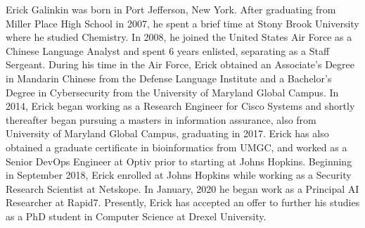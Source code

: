 \normalsize
\nonfrenchspacing
\doublespacing
\setlength{\parindent}{15pt} %
\setlength{\parskip}{3pt} %

Erick Galinkin was born in Port Jefferson, New York.
After graduating from Miller Place High School in 2007, he spent a brief time at Stony Brook University where he studied Chemistry. 
In 2008, he joined the United States Air Force as a Chinese Language Analyst and spent 6 years enlisted, separating as a Staff Sergeant.
During his time in the Air Force, Erick obtained an Associate's Degree in Mandarin Chinese from the Defense Language Institute and a Bachelor's Degree in Cybersecurity from the University of Maryland Global Campus.
In 2014, Erick began working as a Research Engineer for Cisco Systems and shortly thereafter began pursuing a masters in information assurance, also from University of Maryland Global Campus, graduating in 2017.
Erick has also obtained a graduate certificate in bioinformatics from UMGC, and worked as a Senior DevOps Engineer at Optiv prior to starting at Johns Hopkins.
Beginning in September 2018, Erick enrolled at Johns Hopkins while working as a Security Research Scientist at Netskope. 
In January, 2020 he began work as a Principal AI Researcher at Rapid7.
Presently, Erick has accepted an offer to further his studies as a PhD student in Computer Science at Drexel University.